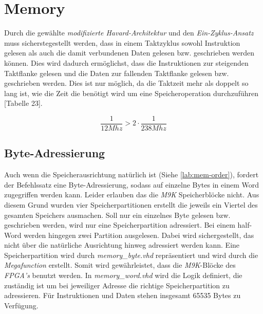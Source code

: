     \section{Memory}

        Durch die gewählte \textit{modifizierte Havard-Architektur} und den \textit{Ein-Zyklus-Ansatz}
        muss sicherstegestellt werden, dass in einem Taktzyklus sowohl Instruktion gelesen als auch die damit verbundenen Daten
        gelesen bzw. geschrieben werden können. Dies wird dadurch ermöglichst, dass die Instruktionen zur steigenden Taktflanke
        gelesen und die Daten zur fallenden Taktflanke gelesen bzw. geschrieben werden.
        Dies ist nur möglich, da die Taktzeit mehr als doppelt so lang ist, wie die Zeit die benötigt wird um eine Speicheroperation
        durchzuführen \cite{intel-cyc10lp-device-datasheet}[Tabelle 23].

        \begin{equation}
            \frac{1}{12Mhz} > 2\cdot\frac{1}{238Mhz}
        \end{equation}
        
        \subsection{Byte-Adressierung}
            Auch wenn die Speicherausrichtung natürlich ist (Siehe \ref{lab:mem-order}), fordert der Befehlssatz eine Byte-Adressierung,
            sodass auf einzelne Bytes in einem Word zugegriffen werden kann. Leider erlauben das die \textit{M9K} Speicherblöcke nicht.
            Aus diesem Grund wurden vier Speicherpartitionen erstellt die jeweils ein Viertel des gesamten Speichers ausmachen.
            Soll nur ein einzelnes Byte gelesen bzw. geschrieben werden, wird nur eine Speicherpartition adressiert.
            Bei einem half-Word werden hingegen zwei Partition ausgelesen. Dabei wird sichergestellt,
            das nicht über die natürliche Ausrichtung hinweg adressiert werden kann.
            Eine Speicherpartition wird durch \textit{memory\_byte.vhd} repräsentiert und wird durch die \textit{Megafunction} erstellt.
            Somit wird gewährleistet, dass die \textit{M9K}-Blöcke des \textit{FPGA's} benutzt werden.
            In \textit{memory\_word.vhd} wird die Logik definiert, die zuständig ist um bei jeweiliger Adresse die 
            richtige Speicherpartition zu adressieren.
            Für Instruktionen und Daten stehen insgesamt 65535 Bytes zu Verfügung.

